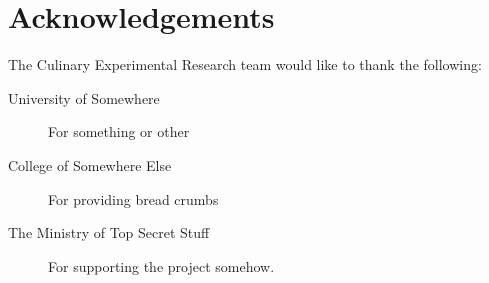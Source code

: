 \documentclass[a4paper,12pt,notumble]{leaflet}
\begin{document}
\section{Acknowledgements}

The Culinary Experimental Research team would like to thank the
following:

\begin{description}

\item[University of Somewhere] For something or other

\item[College of Somewhere Else] For providing bread crumbs

\item[The Ministry of Top Secret Stuff] For supporting the 
project somehow.

\end{description}
\end{document}
